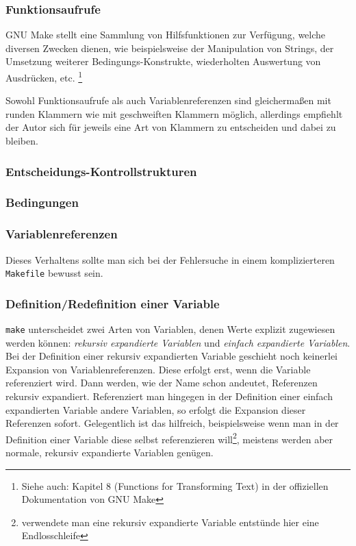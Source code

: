 	\subsubsection*{Funktionsaufrufe}  
		GNU Make stellt eine Sammlung von Hilfsfunktionen zur Verfügung, welche
		diversen Zwecken dienen, wie beispielsweise der Manipulation von
		Strings, der Umsetzung weiterer Bedingungs-Konstrukte, wiederholten
		Auswertung von Ausdrücken, etc.  \footnote{Siehe auch: Kapitel 8 (Functions
		for Transforming Text) in der offiziellen Dokumentation von GNU Make
		}

		Sowohl Funktionsaufrufe als auch Variablenreferenzen sind gleichermaßen
		mit runden Klammern wie mit geschweiften Klammern möglich, allerdings
		empfiehlt der Autor sich für jeweils eine Art von Klammern zu
		entscheiden und dabei zu bleiben.

	\pagebreak
	\subsubsection*{Entscheidungs-Kontrollstrukturen}
		

	\subsubsection*{Bedingungen}
		

	\subsubsection*{Variablenreferenzen}
		
		\noindent
		Dieses Verhaltens sollte man sich bei der Fehlersuche in einem
		komplizierteren \texttt{Makefile} bewusst sein.

	\subsubsection*{Definition/Redefinition einer Variable}
		
		\texttt{make} unterscheidet zwei Arten von Variablen, denen Werte
		explizit zugewiesen werden können: \emph{rekursiv expandierte Variablen}
		und \emph{einfach expandierte Variablen}.
		Bei der Definition einer rekursiv expandierten Variable geschieht noch
		keinerlei Expansion von Variablenreferenzen. Diese erfolgt erst, wenn
		die Variable referenziert wird. Dann werden, wie der Name schon
		andeutet, Referenzen rekursiv expandiert.
		Referenziert man hingegen in der Definition einer einfach expandierten
		Variable andere Variablen, so erfolgt die Expansion dieser Referenzen
		sofort. Gelegentlich ist das hilfreich, beispielsweise wenn man in der
		Definition einer Variable diese selbst referenzieren
		will\footnote{verwendete man eine rekursiv expandierte Variable
		entstünde hier eine Endlosschleife}, meistens werden aber normale,
		rekursiv expandierte Variablen genügen.

